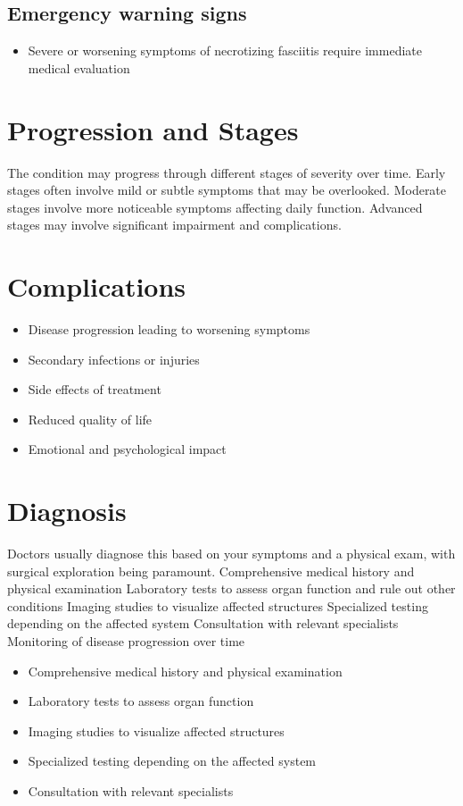 \subsection{Emergency warning signs}
\begin{itemize}[noitemsep]
  \item Severe or worsening symptoms of necrotizing fasciitis require immediate medical evaluation
\end{itemize}
\section{Progression and Stages}
The condition may progress through different stages of severity over time. Early stages often involve mild or subtle symptoms that may be overlooked. Moderate stages involve more noticeable symptoms affecting daily function. Advanced stages may involve significant impairment and complications.
\section{Complications}
\begin{itemize}[noitemsep]
  \item Disease progression leading to worsening symptoms
  \item Secondary infections or injuries
  \item Side effects of treatment
  \item Reduced quality of life
  \item Emotional and psychological impact
\end{itemize}
\section{Diagnosis}
Doctors usually diagnose this based on your symptoms and a physical exam, with surgical exploration being paramount. Comprehensive medical history and physical examination Laboratory tests to assess organ function and rule out other conditions Imaging studies to visualize affected structures Specialized testing depending on the affected system Consultation with relevant specialists Monitoring of disease progression over time

\begin{itemize}[noitemsep]
  \item Comprehensive medical history and physical examination
  \item Laboratory tests to assess organ function
  \item Imaging studies to visualize affected structures
  \item Specialized testing depending on the affected system
  \item Consultation with relevant specialists
\end{itemize}
